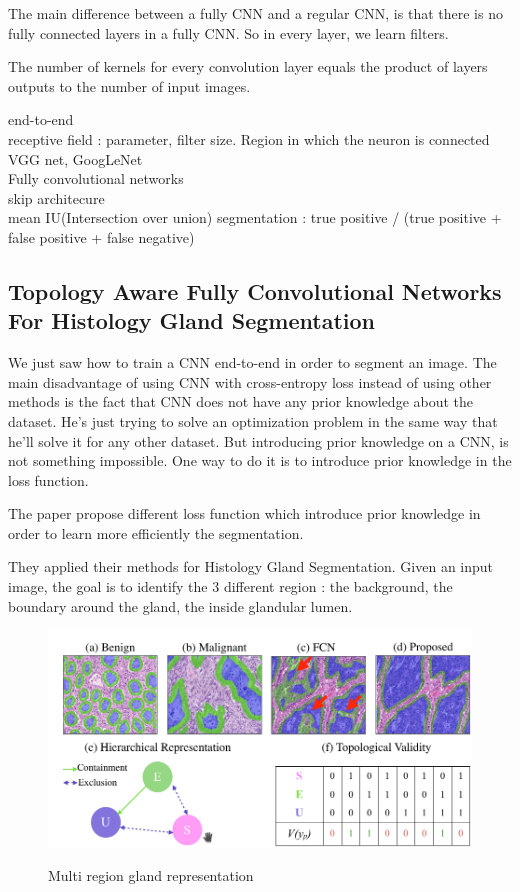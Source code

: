     The main difference between a fully CNN and a regular CNN, is that there is no fully connected layers in a fully CNN. So in every layer, we learn filters. 
    
     The number of kernels for every convolution layer equals the product of layers outputs to the number of input images.
    
    
end-to-end\\
receptive field : parameter, filter size. Region in which the neuron is connected\\
VGG net, GoogLeNet\\
Fully convolutional networks\\
skip architecure\\

mean IU(Intersection over union) segmentation : true positive / (true positive + false positive + false negative) \\


\subsection{Topology Aware Fully Convolutional Networks For Histology Gland Segmentation\cite{FCN_Gland_Segmentation}}
	
    We just saw how to train a CNN end-to-end in order to segment an image. The main disadvantage of using CNN with cross-entropy loss instead of using other methods is the fact that CNN does not have any prior knowledge about the dataset. He's just trying to solve an optimization problem in the same way that he'll solve it for any other dataset. 
    But introducing prior knowledge on a CNN, is not something impossible. One way to do it is to introduce prior knowledge in the loss function. 
    
    The paper \cite{FCN_Gland_Segmentation} propose different loss function which introduce prior knowledge in order to learn more efficiently the segmentation.
	
    They applied their methods for Histology Gland Segmentation. Given an input image, the goal is to identify the 3 different region : the background, the boundary around the gland, the inside glandular lumen.
    
     \begin{figure}
    	\includegraphics[width=\linewidth]{images/multiRegionGlandRepresentation}
        \label{MultiRegionGlandRepresentation}
        \caption{Multi region gland representation}
    \end{figure}
    
